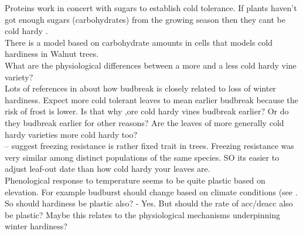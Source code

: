 \documentclass[11pt,letter]{article}
\begin{document}
Proteins work in concert with sugars to establish cold tolerance. If plants haven't got enough sugars (carbohydrates) from the growing season then they cant be cold hardy \citep{Gusta2013}. \\

There is a model based on carbohydrate amounts in cells that models cold hardiness in Walnut trees. \\ 

What are the physiological differences between a more and a less cold hardy vine variety? \\

Lots of references in \cite{Lenz2016} about how budbreak is closely related to loss of winter hardiness. Expect more cold tolerant leaves to mean earlier budbreak because the risk of frost is lower. Is that why ,ore cold hardy vines budbreak earlier? Or do they budbreak earlier for other reasons? Are the leaves of more generally cold hardy varieties more cold hardy too? \\
  
\cite{Lenz2016} – suggest freezing resistance is rather fixed trait in trees. Freezing resistance was very similar among distinct populations of the same species. SO its easier to adjust leaf-out date than how cold hardy your leaves are. \\

Phenological response to temperature seems to be quite plastic based on elevation. For example budburst should change based on climate conditions (see \citep{Caffarra2010}. So should hardiness be plastic also? - Yes. But should the rate of acc/deacc also be plastic? Maybe this relates to the physiological mechanisms underpinning winter hardiness? \\



\end{document}
